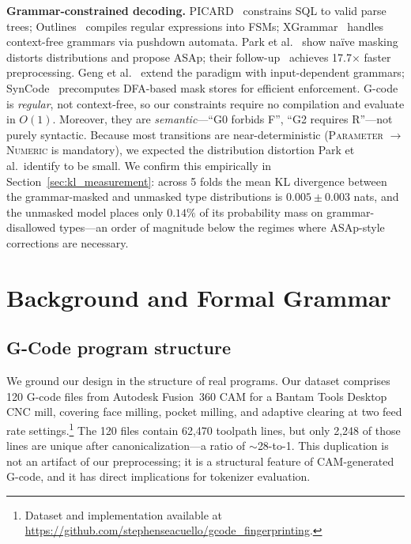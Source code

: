 \documentclass[11pt]{article}
\begin{document}
\textbf{Grammar-constrained decoding.}
PICARD~\cite{picard} constrains SQL to valid parse trees; Outlines~\cite{outlines} compiles regular expressions into FSMs; XGrammar~\cite{xgrammar} handles context-free grammars via pushdown automata. Park et al.~\cite{grammar_aligned} show na\"ive masking distorts distributions and propose ASAp; their follow-up~\cite{flexible_gcd} achieves 17.7$\times$ faster preprocessing. Geng et al.~\cite{gcd_input_dependent} extend the paradigm with input-dependent grammars; SynCode~\cite{syncode} precomputes DFA-based mask stores for efficient enforcement. G-code is \emph{regular}, not context-free, so our constraints require no compilation and evaluate in $O(1)$. Moreover, they are \emph{semantic}---``G0 forbids F'', ``G2 requires R''---not purely syntactic. Because most transitions are near-deterministic (\textsc{Parameter} $\to$ \textsc{Numeric} is mandatory), we expected the distribution distortion Park et al.\ identify to be small. We confirm this empirically in Section~\ref{sec:kl_measurement}: across 5 folds the mean KL divergence between the grammar-masked and unmasked type distributions is $0.005 \pm 0.003$ nats, and the unmasked model places only $0.14\%$ of its probability mass on grammar-disallowed types---an order of magnitude below the regimes where ASAp-style corrections are necessary.

\section{Background and Formal Grammar}
\label{sec:anatomy}

\subsection{G-Code program structure}
\label{sec:program_structure}

We ground our design in the structure of real programs. Our dataset comprises 120 G-code files from Autodesk Fusion~360 CAM for a Bantam Tools Desktop CNC mill, covering face milling, pocket milling, and adaptive clearing at two feed rate settings.\footnote{Dataset and implementation available at \url{https://github.com/stephenseacuello/gcode\_fingerprinting}.} The 120 files contain 62{,}470 toolpath lines, but only 2{,}248 of those lines are unique after canonicalization---a ratio of $\sim$28-to-1. This duplication is not an artifact of our preprocessing; it is a structural feature of CAM-generated G-code, and it has direct implications for tokenizer evaluation.
\end{document}
